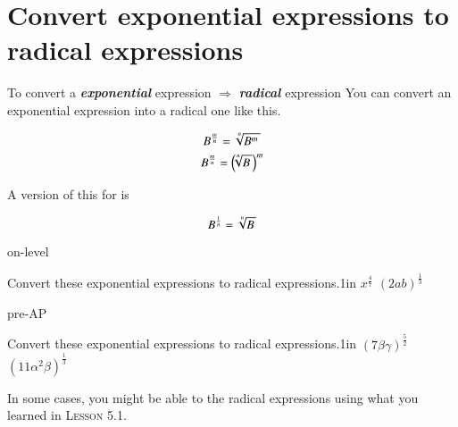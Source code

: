 \section*{Convert exponential expressions to radical expressions}
%
\begin{myConcept}{%
        To convert 
        a {\bfseries\itshape exponential} expression 
        $\Longrightarrow$
        {\bfseries\itshape radical} expression%
    }%
    You can convert an exponential expression into a radical one like this.
    \begin{myCenteredBox}[width=3.25in]
        \Large
        \[
            B ^ {\frac{m}{n}}
            =
            \myRoot[n]{B^m} 
        \]
        \[
            B ^ {\frac{m}{n}}
            =
            \left(\hspace{-0.25em} \myRoot[n]{B} \right)^m
        \]
    \end{myCenteredBox}
    A version of this for  is
    \begin{myCenteredBox}[width=3.25in]
        \Large
        \[
            B ^ {\frac{1}{n}}
            =
            \myRoot[n]{B}
        \]
    \end{myCenteredBox}
\end{myConcept}




\begin{taggedblock}{on-level}
    \begin{myProblems2}{Convert these exponential expressions to radical expressions.}{1in}
        {
            $ x^{\frac{4}{7}}$ 
        }
        {
            $ (2ab)^\frac{1}{3}$ 
        }
    \end{myProblems2}
\end{taggedblock}
\begin{taggedblock}{pre-AP}
    \begin{myProblems2}{Convert these exponential expressions to radical expressions.}{1in}
        {
            \Large $ (7\beta\gamma)^\frac{5}{2}$ 
        }
        {
            \Large $ (11\alpha^2\beta)^\frac{1}{3}$ 
        }
    \end{myProblems2}
\end{taggedblock}


\vspace{\baselineskip}
In some cases, you might be able to  the radical expressions using 
what you learned in {\scshape Lesson 5.1}.

